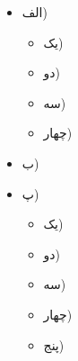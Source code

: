 
\begin{itemize}
	\item الف)
	\begin{itemize}
		\item یک)
		\item دو)
		\item سه)
		\item چهار)
	\end{itemize}
	\item ب)
	\item پ)
	\begin{itemize}
		\item یک)
		\item دو)
		\item سه)
		\item چهار)
		\item پنج)
	\end{itemize}
\end{itemize}
